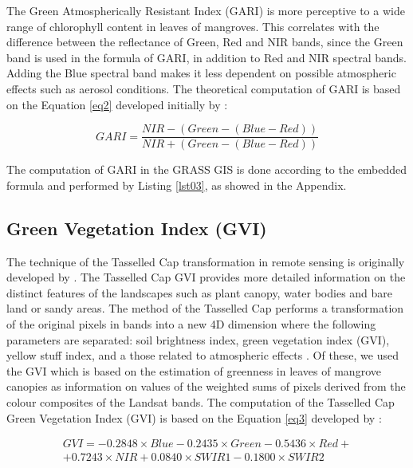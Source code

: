 \documentclass[jmse,article,submit,pdftex,moreauthors]{Definitions/mdpi}
\begin{document}
The Green Atmospherically Resistant Index (GARI) is more perceptive to a wide range of chlorophyll content in leaves of mangroves. This correlates with the difference between the reflectance of Green, Red and NIR bands, since the Green band is used in the formula of GARI, in addition to Red and NIR spectral bands. Adding the Blue spectral band makes it less dependent on possible atmospheric effects such as aerosol conditions. The theoretical computation of GARI is based on the Equation \ref{eq2} developed initially by \cite{GITELSON1996289}:

\begin{equation}\label{eq2}
	GARI = \frac{NIR - (Green - (Blue - Red))}{NIR + (Green - (Blue - Red))}
\end{equation} 

The computation of GARI in the GRASS GIS is done according to the embedded formula and performed by Listing \ref{lst03}, as showed in the Appendix.

\subsection{Green Vegetation Index (GVI)}

The technique of the Tasselled Cap transformation in remote sensing is originally developed by \cite{KauthThomas}. The Tasselled Cap GVI provides more detailed information on the distinct features of the landscapes such as plant canopy, water bodies and bare land or sandy areas. The method of the Tasselled Cap performs a transformation of the original pixels in bands into a new 4D dimension where the following parameters are separated: soil brightness index, green vegetation index (GVI), yellow stuff index, and a those related to atmospheric effects \cite{Huang2002}. Of these, we used the GVI which is based on the estimation of greenness in leaves of mangrove canopies as information on values of the weighted sums of pixels derived from the colour composites of the Landsat bands. The computation of the Tasselled Cap Green Vegetation Index (GVI) is based on the Equation \ref{eq3} developed by \cite{4157507}:

\begin{equation}\label{eq3}
\begin{split}
	GVI = -0.2848 \times Blue - 0.2435 \times Green - 0.5436 \times Red + \\
	+ 0.7243 \times NIR + 0.0840 \times SWIR1- 0.1800 \times SWIR2
\end{split}
\end{equation}
\end{document}
